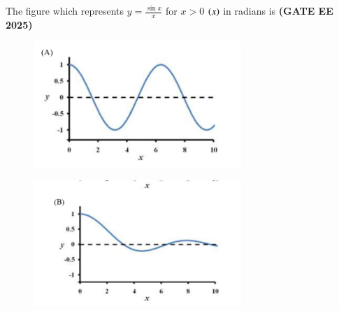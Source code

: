 \documentclass[journal,12pt,onecolumn]{IEEEtran}
\theoremstyle{remark}
\begin{document}
\begin{enumerate}
\newpage
The figure which represents $y=\frac{\sin x}{x}$ for $x>0$ $\left(x\right)$ in radians is \hfill \textbf{(GATE EE 2025)}
\begin{figure}
\begin{center}
\includegraphics[width=0.7\textwidth]{figs/4a.png}
	\caption{}
	\label{fig4a}
\end{center}
\end{figure}
\begin{figure}
\begin{center}
\includegraphics[width=0.7\textwidth]{figs/4b.png}
	\caption{}
	\label{fig4b}
\end{center}
	\end{figure}
	\begin{figure}


\end{figure}
\end{enumerate}
\end{document}
